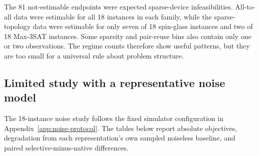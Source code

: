\documentclass[a4paper,onecolumn,11pt,unpublished]{quantumarticle}
\theoremstyle{remark}
\begin{document}
The 81 not-estimable endpoints were expected sparse-device infeasibilities.
All-to-all data were estimable for all 18 instances in each family, while the
sparse-topology data were estimable for only seven of 18 spin-glass instances
and two of 18 Max-3SAT instances.  Some sparsity and pair-reuse bins also
contain only one or two observations.  The regime counts therefore show useful
patterns, but they are too small for a universal rule about problem structure.

\FloatBarrier
\subsection{Limited study with a representative noise model}
\label{sec:results-noise}

The 18-instance noise study follows the fixed simulator configuration in
Appendix~\ref{app:noise-protocol}. The tables below report absolute objectives,
degradation from each representation's own sampled noiseless baseline, and
paired selective-minus-native differences.

\begin{table}[!htbp]
    \centering
    \small
    \caption{Descriptive means in the limited noise study.  Lower objective
    values are better.  Degradation is the high-noise objective minus the
    noiseless objective.  The final column is the high-noise auxiliary
    inconsistency rate $R_{\mathrm{inc}}$ from \cref{eq:rinc}.}
    \label{tab:e6-noise-summary}

\end{table}
\end{document}
